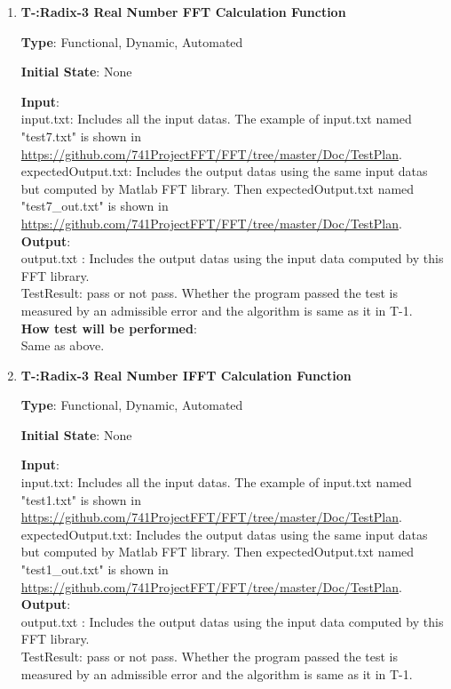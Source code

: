 \documentclass[12pt, titlepage]{article}
\newcounter{tnum}
\begin{document}
\begin{enumerate}

\item{\textbf{T-\thetnum:Radix-3 Real Number FFT Calculation Function}}

\textbf {Type}: Functional, Dynamic, Automated
					
\textbf {Initial State}: None
					
\textbf {Input}:\\
{\large input.txt}: Includes all the input datas. The example of input.txt named "test7.txt" is shown in \url{https://github.com/741ProjectFFT/FFT/tree/master/Doc/TestPlan}. \\
{\large expectedOutput.txt}:  Includes the output datas using the same input datas but computed by Matlab FFT library. Then expectedOutput.txt named "test7\_out.txt" is shown in \url{https://github.com/741ProjectFFT/FFT/tree/master/Doc/TestPlan}.\\
					
\textbf {Output}: \\{\large output.txt} : Includes the output datas using the input data computed by this FFT library.\\
{\large TestResult}: pass or not pass. Whether the program passed the test is measured by an admissible error and the algorithm is same as it in T-1.\\
					
\textbf {How test will be performed}: \\
Same as above.

\item{\textbf{T-\thetnum:Radix-3 Real Number IFFT Calculation Function}}

\textbf {Type}: Functional, Dynamic, Automated
					
\textbf {Initial State}: None
					
\textbf {Input}:\\
{\large input.txt}: Includes all the input datas. The example of input.txt named "test1.txt" is shown in \url{https://github.com/741ProjectFFT/FFT/tree/master/Doc/TestPlan}.\\
{\large expectedOutput.txt}:  Includes the output datas using the same input datas but computed by Matlab FFT library. Then expectedOutput.txt named "test1\_out.txt" is shown in \url{https://github.com/741ProjectFFT/FFT/tree/master/Doc/TestPlan}.\\
					
\textbf {Output}: \\{\large output.txt} : Includes the output datas using the input data computed by this FFT library.\\
{\large TestResult}: pass or not pass. Whether the program passed the test is measured by an admissible error and the algorithm is same as it in T-1.\\


\end{enumerate}
\end{document}

